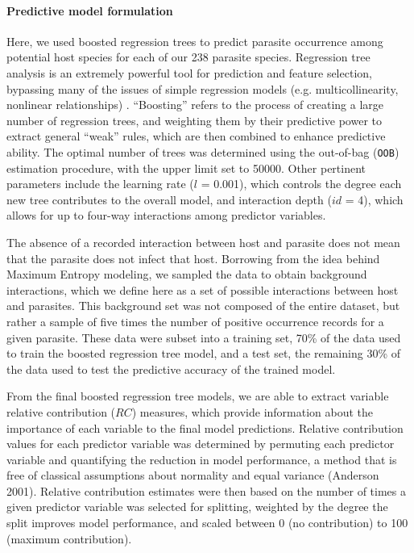 \documentclass[12pt]{article}
\begin{document}
 
 \paragraph{Predictive model formulation}
  Here, we used boosted regression trees to predict parasite occurrence among potential host species for each of our 238 parasite species. Regression tree analysis is an extremely powerful tool for prediction and feature selection, bypassing many of the issues of simple regression models (e.g. multicollinearity, nonlinear relationships) \cite{elith2008, dallas2014}. “Boosting” refers to the process of creating a large number of regression trees, and weighting them by their predictive power to extract general “weak” rules, which are then combined to enhance predictive ability. The optimal number of trees was determined using the out-of-bag (\texttt{OOB}) estimation procedure, with the upper limit set to 50000. Other pertinent parameters include the learning rate ($l$ = 0.001), which controls the degree each new tree contributes to the overall model, and interaction depth ($id$ = 4), which allows for up to four-way interactions among predictor variables.
  
  The absence of a recorded interaction between host and parasite does not mean that the parasite does not infect that host. Borrowing from the idea behind Maximum Entropy modeling, we sampled the data to obtain background interactions, which we define here as a set of possible interactions between host and parasites. This background set was not composed of the entire dataset, but rather a sample of five times the number of positive occurrence records for a given parasite. These data were subset into a training set, 70\% of the data used to train the boosted regression tree model, and a test set, the remaining 30\% of the data used to test the predictive accuracy of the trained model.
  
  From the final boosted regression tree models, we are able to extract variable relative contribution ($RC$) measures, which provide information about the importance of each variable to the final model predictions. Relative contribution values for each predictor variable was determined by permuting each predictor variable and quantifying the reduction in model performance, a method that is free of classical assumptions about normality and equal variance (Anderson 2001). Relative contribution estimates were then based on the number of times a given predictor variable was selected for splitting, weighted by the degree the split improves model performance, and scaled between 0 (no contribution) to 100 (maximum contribution). 
  
\end{document}
